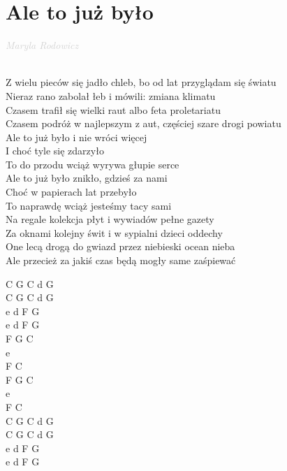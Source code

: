 \documentclass[a5paper, 10pt]{book}
\begin{document}
\section{Ale to już było}\textcolor{lightgray}{\textit{Maryla Rodowicz}}\\~\\
\begin{minipage}[t]{0.8\textwidth}
  Z wielu pieców się jadło chleb, bo od lat przyglądam się światu\\
  Nieraz rano zabolał łeb i mówili: zmiana klimatu\\
  Czasem trafił się wielki raut albo feta proletariatu\\
  Czasem podróż w najlepszym z aut, częściej szare drogi powiatu\\

  \hspace*{2mm} Ale to już było i nie wróci więcej\\
  \hspace*{2mm} I choć tyle się zdarzyło\\
  \hspace*{2mm} To do przodu wciąż wyrywa głupie serce\\
  \hspace*{2mm} Ale to już było znikło, gdzieś za nami\\
  \hspace*{2mm} Choć w papierach lat przebyło\\
  \hspace*{2mm} To naprawdę wciąż jesteśmy tacy sami\\

  Na regale kolekcja płyt i wywiadów pełne gazety\\
  Za oknami kolejny świt i w sypialni dzieci oddechy\\
  One lecą drogą do gwiazd przez niebieski ocean nieba\\
  Ale przecież za jakiś czas będą mogły same zaśpiewać\\

\end{minipage}
\begin{minipage}[t]{0.2\textwidth}

  C G C d G\\
  C G C d G\\
  e d F G \\
  e d F G \\

  F G C\\
  e\\
  F C \\
  F G C\\
  e\\
  F C \\

  C G C d G\\
  C G C d G\\
  e d F G \\
  e d F G \\

\end{minipage}
\end{document}
